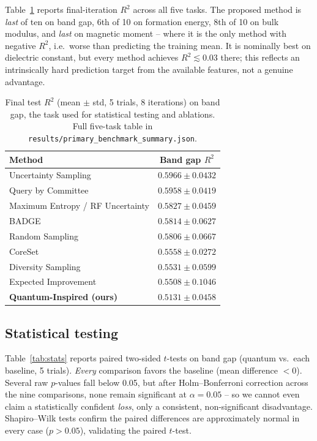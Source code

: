 \documentclass[conference]{IEEEtran}
\begin{document}
Table~\ref{tab:primary} reports final-iteration $R^2$ across all five tasks. The proposed method is \emph{last} of ten on band gap, 6th of 10 on formation energy, 8th of 10 on bulk modulus, and \emph{last} on magnetic moment -- where it is the only method with negative $R^2$, i.e.\ worse than predicting the training mean. It is nominally best on dielectric constant, but every method achieves $R^2\lesssim 0.03$ there; this reflects an intrinsically hard prediction target from the available features, not a genuine advantage.

\begin{table}[!t]
\centering
\caption{Final test $R^2$ (mean $\pm$ std, 5 trials, 8 iterations) on band gap, the task used for statistical testing and ablations. Full five-task table in \texttt{results/primary\_benchmark\_summary.json}.}
\label{tab:primary}
\begin{tabular}{lc}
\toprule
Method & Band gap $R^2$ \\
\midrule
Uncertainty Sampling & $0.5966 \pm 0.0432$ \\
Query by Committee & $0.5958 \pm 0.0419$ \\
Maximum Entropy / RF Uncertainty & $0.5827 \pm 0.0459$ \\
BADGE & $0.5814 \pm 0.0627$ \\
Random Sampling & $0.5806 \pm 0.0667$ \\
CoreSet & $0.5558 \pm 0.0272$ \\
Diversity Sampling & $0.5531 \pm 0.0599$ \\
Expected Improvement & $0.5508 \pm 0.1046$ \\
\textbf{Quantum-Inspired (ours)} & $\mathbf{0.5131 \pm 0.0458}$ \\
\bottomrule
\end{tabular}
\end{table}

\subsection{Statistical testing}

Table~\ref{tab:stats} reports paired two-sided $t$-tests on band gap (quantum vs.\ each baseline, 5 trials). \emph{Every} comparison favors the baseline (mean difference $<0$). Several raw $p$-values fall below 0.05, but after Holm--Bonferroni correction across the nine comparisons, none remain significant at $\alpha=0.05$ -- so we cannot even claim a statistically confident \emph{loss}, only a consistent, non-significant disadvantage. Shapiro--Wilk tests confirm the paired differences are approximately normal in every case ($p>0.05$), validating the paired $t$-test.
\end{document}
